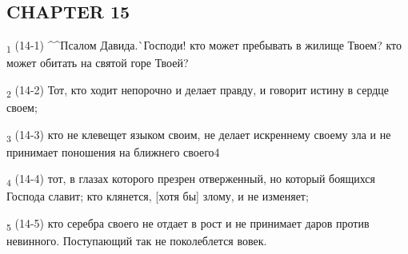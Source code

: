 \subsection{CHAPTER 15}
\begin{tcolorbox}
\textsubscript{1} (14-1) ^^Псалом Давида.^^ Господи! кто может пребывать в жилище Твоем? кто может обитать на святой горе Твоей?
\end{tcolorbox}
\begin{tcolorbox}
\textsubscript{2} (14-2) Тот, кто ходит непорочно и делает правду, и говорит истину в сердце своем;
\end{tcolorbox}
\begin{tcolorbox}
\textsubscript{3} (14-3) кто не клевещет языком своим, не делает искреннему своему зла и не принимает поношения на ближнего своего4
\end{tcolorbox}
\begin{tcolorbox}
\textsubscript{4} (14-4) тот, в глазах которого презрен отверженный, но который боящихся Господа славит; кто клянется, [хотя бы] злому, и не изменяет;
\end{tcolorbox}
\begin{tcolorbox}
\textsubscript{5} (14-5) кто серебра своего не отдает в рост и не принимает даров против невинного. Поступающий так не поколеблется вовек.
\end{tcolorbox}

